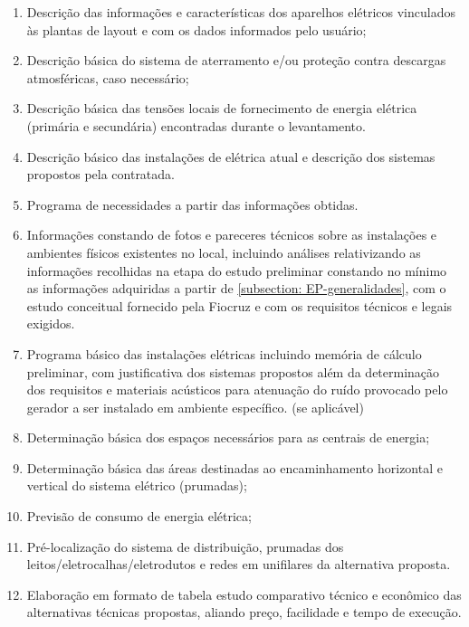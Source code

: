 \begin{enumerate}
\begin{enumerate}
			\item Descrição das informações e características dos aparelhos elétricos vinculados às plantas de layout e com os dados informados pelo usuário; 			

			\item Descrição básica do sistema de aterramento e/ou proteção contra descargas atmosféricas, caso necessário;

			\item Descrição básica das tensões locais de fornecimento de energia elétrica (primária e secundária) encontradas durante o levantamento.
			
			\item Descrição básico das instalações de elétrica atual e descrição dos sistemas propostos pela contratada.
			
			\item Programa de necessidades a partir das informações obtidas.

			\item Informações constando de fotos e pareceres técnicos sobre as instalações e ambientes físicos existentes no local, incluindo análises relativizando as informações recolhidas na etapa do estudo preliminar constando no mínimo as informações adquiridas a partir de \ref{subsection: EP-generalidades}, com o estudo conceitual fornecido pela Fiocruz e com os requisitos técnicos e legais exigidos.
			
			\item Programa básico das instalações elétricas incluindo memória de cálculo preliminar, com justificativa dos sistemas propostos além da determinação dos requisitos e materiais acústicos para atenuação do ruído provocado pelo gerador a ser instalado em ambiente específico. (se aplicável)			
			
			\item Determinação básica dos espaços necessários para as centrais de energia;
			
			\item Determinação básica das áreas destinadas ao encaminhamento horizontal e vertical do sistema elétrico (prumadas);
			
			\item Previsão de consumo de energia elétrica;
			
			\item Pré-localização do sistema de distribuição, prumadas dos leitos/eletrocalhas/eletrodutos e redes em unifilares da alternativa proposta.

			\item Elaboração em formato de tabela estudo comparativo técnico e econômico das alternativas técnicas propostas, aliando preço, facilidade e tempo de execução.
			

\end{enumerate}
\end{enumerate}
